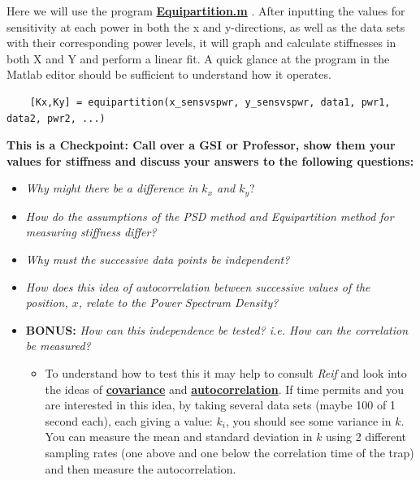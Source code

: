 \documentclass{../lab}
\begin{document}
Here we will use the program \href{http://dev-physicsadv.pantheon.berkeley.edu/sites/default/files/matlab\_fitting/Equipartition.m}{\textbf{Equipartition.m}} . After inputting the values for sensitivity at each power in both the x and y-directions, as well as the data sets with their corresponding power levels, it will graph and calculate stiffnesses in both X and Y and perform a linear fit. A quick glance at the program in the Matlab editor should be sufficient to understand how it operates.
\begin{verbatim}
    [Kx,Ky] = equipartition(x_sensvspwr, y_sensvspwr, data1, pwr1, data2, pwr2, ...)
\end{verbatim}
\textbf{This is a Checkpoint: Call over a GSI or Professor, show them your values for stiffness and discuss your answers to the following questions:}
\begin{itemize}
    \item \emph{Why might there be a difference in $k_x$ and $k_y$}?

    \item \emph{How do the assumptions of the PSD method and Equipartition method for measuring stiffness differ?}

    \item \emph{Why must the successive data points be independent?}

    \item \emph{How does this idea of autocorrelation between successive values of the position, $x$, relate to the Power Spectrum Density?}

    \item \textbf{BONUS:} \emph{How can this independence be tested? i.e. How can the correlation be measured?}

    \begin{itemize}
        \item To understand how to test this it may help to consult \emph{Reif} and look into the ideas of \href{http://en.wikipedia.org/wiki/Covariance}{\textbf{covariance}} and \href{http://en.wikipedia.org/wiki/Autocorrelation}{\textbf{autocorrelation}}. If time permits and you are interested in this idea, by taking several data sets (maybe 100 of 1 second each), each giving a value: $k_i$, you should see some variance in $k$. You can measure the mean and standard deviation in $k$ using 2 different sampling rates (one above and one below the correlation time of the trap) and then measure the autocorrelation.
    \end{itemize}

\end{itemize}
\end{document}
